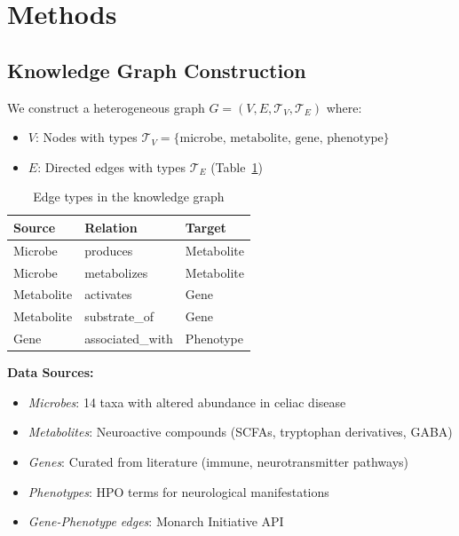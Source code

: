 \documentclass{article}
\begin{document}
\section{Methods}

\subsection{Knowledge Graph Construction}

We construct a heterogeneous graph $G = (V, E, \mathcal{T}_V, \mathcal{T}_E)$ where:
\begin{itemize}
    \item $V$: Nodes with types $\mathcal{T}_V = \{\text{microbe, metabolite, gene, phenotype}\}$
    \item $E$: Directed edges with types $\mathcal{T}_E$ (Table~\ref{tab:edge_types})
\end{itemize}

\begin{table}[h]
\centering
\caption{Edge types in the knowledge graph}
\label{tab:edge_types}
\begin{tabular}{lll}
\toprule
\textbf{Source} & \textbf{Relation} & \textbf{Target} \\
\midrule
Microbe & produces & Metabolite \\
Microbe & metabolizes & Metabolite \\
Metabolite & activates & Gene \\
Metabolite & substrate\_of & Gene \\
Gene & associated\_with & Phenotype \\
\bottomrule
\end{tabular}
\end{table}

\textbf{Data Sources:}
\begin{itemize}
    \item \textit{Microbes}: 14 taxa with altered abundance in celiac disease \citep{arcila2022microbiome}
    \item \textit{Metabolites}: Neuroactive compounds (SCFAs, tryptophan derivatives, GABA)
    \item \textit{Genes}: Curated from literature (immune, neurotransmitter pathways)
    \item \textit{Phenotypes}: HPO terms for neurological manifestations
    \item \textit{Gene-Phenotype edges}: Monarch Initiative API
\end{itemize}
\end{document}
